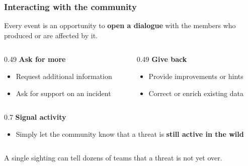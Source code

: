 \begin{frame}
    \frametitle{Interacting with the community}

    Every event is an opportunity to \textbf{open a dialogue} with the members
    who produced or are affected by it.

    \vspace{0.5em}

    \begin{center}
        \begin{columns}[T]
            \begin{column}{0.49\textwidth}
                \card{\linewidth}{2.5em}
                    {{\Large\faQuestionCircle}\hspace{0.3em}\textbf{Ask for more}}
                    {
                        \begin{itemize}
                            \item Request additional information
                            \item Ask for support on an incident
                        \end{itemize}
                    }
            \end{column}
            \begin{column}{0.49\textwidth}
                \card{\linewidth}{2.5em}
                    {{\Large\faLightbulb}\hspace{0.3em}\textbf{Give back}}
                    {
                        \begin{itemize}
                            \item Provide improvements or hints
                            \item Correct or enrich existing data
                        \end{itemize}
                    }
            \end{column}
        \end{columns}

        \vspace{-0.5em}

        \begin{columns}[T]
            \begin{column}{0.7\textwidth}
                \card{\linewidth}{2.5em}
                    {{\Large\faBullhorn}\hspace{0.3em}\textbf{Signal activity}}
                    {
                        \begin{itemize}
                            \item Simply let the community know that a threat
                                  is \textbf{still active in the wild}
                        \end{itemize}
                    }
            \end{column}
        \end{columns}
    \end{center}

    \vspace{0.8em}

    \centering
    \small
    A single sighting can tell dozens of teams that a threat is not yet over.
\end{frame}
